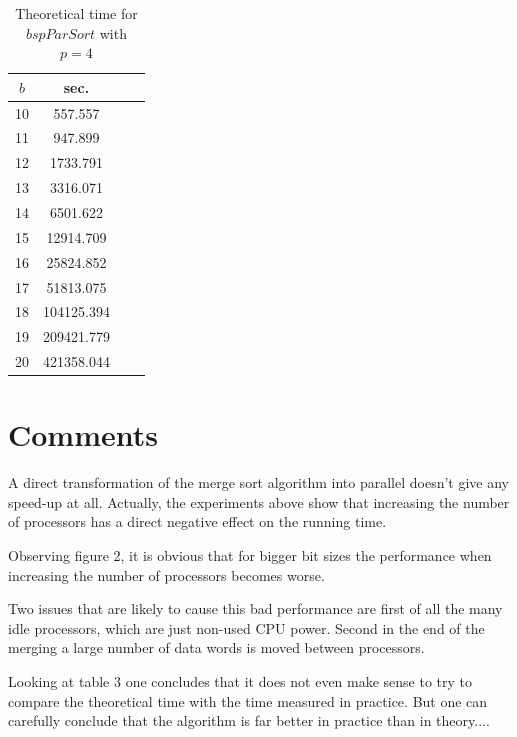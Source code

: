 \documentclass[a4paper,12pt,article]{memoir}
\theoremstyle{plain}
\theoremstyle{definition}
\theoremstyle{remark}
\theoremstyle{plain}
\theoremstyle{remark}
\begin{document}
\begin{table}
\label{table:benchgetHuygens}
\begin{center}
\begin{tabular}{|c|c|c|c|}
\hline 
$b$ & sec. \\ 
\hline 
10 &  557.557 \\ 
\hline 
11 &  947.899 \\ 
\hline
12 &  1733.791 \\
\hline
13 &  3316.071 \\
\hline
14 &  6501.622\\
\hline
15 &  12914.709\\ 
\hline 
16 &  25824.852 \\ 
\hline 
17 &  51813.075 \\ 
\hline
18 &  104125.394 \\
\hline
19 &  209421.779 \\
\hline
20 &  421358.044\\
\hline
\end{tabular}
\caption{Theoretical time for $bspParSort$ with $p=4$}
\end{center}
\end{table}

\section{Comments}
A direct transformation of the merge sort algorithm into parallel doesn't give any speed-up at all. Actually, the experiments above show that increasing the number of processors has a direct negative effect on the running time. 

Observing figure 2, it is obvious that for bigger bit sizes the performance when increasing the number of processors becomes worse. 

Two issues that are likely to cause this bad performance are first of all the many idle processors, which are just non-used CPU power. Second in the end of the merging a large number of data words is moved between processors. 

Looking at table 3 one concludes that it does not even make sense to try to compare the theoretical time with the time measured in practice. But one can carefully conclude that the algorithm is far better in practice than in theory....

\appendix
\end{document}
